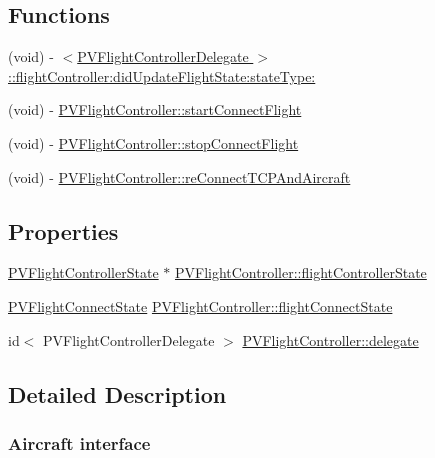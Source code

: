 \subsection*{Functions}
\begin{DoxyCompactItemize}
\item 
(void) -\/ \hyperlink{group___p_v_s_d_k___c_o_r_e___a_p_i___f_l_i_g_h_t_c_o_n_t_r_o_l_ga7065f4031ff8e4f9215d2a30f6efed8e}{$<$\+P\+V\+Flight\+Controller\+Delegate $>$\+::flight\+Controller\+:did\+Update\+Flight\+State\+:state\+Type\+:}
\item 
(void) -\/ \hyperlink{group___p_v_s_d_k___c_o_r_e___a_p_i___f_l_i_g_h_t_c_o_n_t_r_o_l_ga54cce08ed7fbc63fd32a076ec8b2e3ed}{P\+V\+Flight\+Controller\+::start\+Connect\+Flight}
\item 
(void) -\/ \hyperlink{group___p_v_s_d_k___c_o_r_e___a_p_i___f_l_i_g_h_t_c_o_n_t_r_o_l_gabedbf3ef8ff8e1402c56845059ab6667}{P\+V\+Flight\+Controller\+::stop\+Connect\+Flight}
\item 
(void) -\/ \hyperlink{group___p_v_s_d_k___c_o_r_e___a_p_i___f_l_i_g_h_t_c_o_n_t_r_o_l_ga0440c5e54f3adc56334f72975cc18bcf}{P\+V\+Flight\+Controller\+::re\+Connect\+T\+C\+P\+And\+Aircraft}
\end{DoxyCompactItemize}
\subsection*{Properties}
\begin{DoxyCompactItemize}
\item 
\hyperlink{interface_p_v_flight_controller_state}{P\+V\+Flight\+Controller\+State} $\ast$ \hyperlink{group___p_v_s_d_k___c_o_r_e___a_p_i___f_l_i_g_h_t_c_o_n_t_r_o_l_ga049b45174bb8ef2d3e286d75c8b2867a}{P\+V\+Flight\+Controller\+::flight\+Controller\+State}
\item 
\hyperlink{_p_v_flight_controller_state_8h_a114bcb647c32c73c1dc06e9a9e302492}{P\+V\+Flight\+Connect\+State} \hyperlink{group___p_v_s_d_k___c_o_r_e___a_p_i___f_l_i_g_h_t_c_o_n_t_r_o_l_gaa07ec3ee333e95a545483b099f6f3bce}{P\+V\+Flight\+Controller\+::flight\+Connect\+State}
\item 
id$<$ P\+V\+Flight\+Controller\+Delegate $>$ \hyperlink{group___p_v_s_d_k___c_o_r_e___a_p_i___f_l_i_g_h_t_c_o_n_t_r_o_l_ga8059edb708930a8ac1acce2aa1c7fcc1}{P\+V\+Flight\+Controller\+::delegate}
\end{DoxyCompactItemize}


\subsection{Detailed Description}
\hypertarget{flight-page}{}\subsubsection{Aircraft interface}\label{flight-page}


